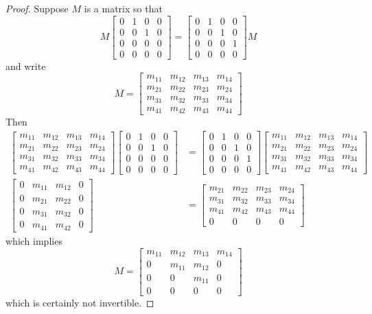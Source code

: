 \documentclass[12pt,leqno]{article}
\numberwithin{equation}{section}
\theoremstyle{definition}
\begin{document}
\begin{proof}
 Suppose $M$ is a matrix so that \[M\begin{bmatrix}0&1&0&0\\0&0&1&0\\0&0&0&0\\0&0&0&0\end{bmatrix}=\begin{bmatrix}0&1&0&0\\0&0&1&0\\0&0&0&1\\0&0&0&0\end{bmatrix}M\]and write \[M=\begin{bmatrix}m_{11}&m_{12}&m_{13}&m_{14}\\m_{21}&m_{22}&m_{23}&m_{24}\\m_{31}&m_{32}&m_{33}&m_{34}\\m_{41}&m_{42}&m_{43}&m_{44}\end{bmatrix}\] Then \begin{align*}\begin{bmatrix}m_{11}&m_{12}&m_{13}&m_{14}\\m_{21}&m_{22}&m_{23}&m_{24}\\m_{31}&m_{32}&m_{33}&m_{34}\\m_{41}&m_{42}&m_{43}&m_{44}\end{bmatrix}\begin{bmatrix}0&1&0&0\\0&0&1&0\\0&0&0&0\\0&0&0&0\end{bmatrix}&=\begin{bmatrix}0&1&0&0\\0&0&1&0\\0&0&0&1\\0&0&0&0\end{bmatrix}\begin{bmatrix}m_{11}&m_{12}&m_{13}&m_{14}\\m_{21}&m_{22}&m_{23}&m_{24}\\m_{31}&m_{32}&m_{33}&m_{34}\\m_{41}&m_{42}&m_{43}&m_{44}\end{bmatrix}\\\begin{bmatrix}0&m_{11}&m_{12}&0\\0&m_{21}&m_{22}&0\\0&m_{31}&m_{32}&0\\0&m_{41}&m_{42}&0\end{bmatrix}&=\begin{bmatrix}m_{21}&m_{22}&m_{23}&m_{24}\\m_{31}&m_{32}&m_{33}&m_{34}\\m_{41}&m_{42}&m_{43}&m_{44}\\0&0&0&0\end{bmatrix}\end{align*}which implies \[M=\begin{bmatrix}m_{11}&m_{12}&m_{13}&m_{14}\\0&m_{11}&m_{12}&0\\0&0&m_{11}&0\\0&0&0&0\end{bmatrix}\] which is certainly not invertible. 

\end{proof}
\end{document}

